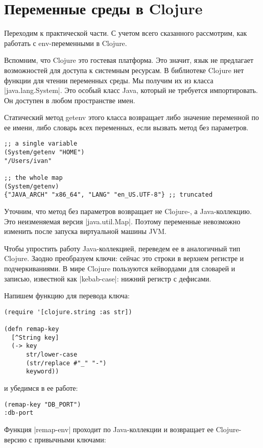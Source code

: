 \section{Переменные среды в Clojure}

Переходим к практической части. С учетом всего сказанного рассмотрим, как
работать с env-переменными в Clojure.

Вспомним, что Clojure это гостевая платформа. Это значит, язык не предлагает
возможностей для доступа к системным ресурсам. В библиотеке Clojure нет функции
для чтении переменных среды. Мы получим их из класса \spverb|java.lang.System|. Это
особый класс Java, который не требуется импортировать. Он доступен в любом
пространстве имен.

Статический метод getenv этого класса возвращает либо значение переменной по ее
имени, либо словарь всех переменных, если вызвать метод без параметров.

\begin{verbatim}
;; a single variable
(System/getenv "HOME")
"/Users/ivan"

;; the whole map
(System/getenv)
{"JAVA_ARCH" "x86_64", "LANG" "en_US.UTF-8"} ;; truncated
\end{verbatim}

Уточним, что метод без параметров возвращает не Clojure-, а Java-коллекцию. Это
неизменяемая версия \spverb|java.util.Map|. Поэтому переменные невозможно изменить
после запуска виртуальной машины JVM.

Чтобы упростить работу Java-коллекцией, переведем ее в аналогичный тип
Clojure. Заодно преобразуем ключи: сейчас это строки в верхнем регистре и
подчеркиваниями. В мире Clojure пользуются кейвордами для словарей и записью,
известной как \spverb|kebab-case|: нижний регистр с дефисами.

Напишем функцию для перевода ключа:

\begin{verbatim}
(require '[clojure.string :as str])

(defn remap-key
  [^String key]
  (-> key
      str/lower-case
      (str/replace #"_" "-")
      keyword))
\end{verbatim}

и убедимся в ее работе:

\begin{verbatim}
(remap-key "DB_PORT")
:db-port
\end{verbatim}

Функция \spverb|remap-env| проходит по Java-коллекции и возвращает ее Clojure-версию с
привычными ключами:

